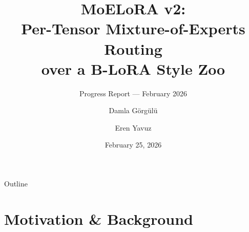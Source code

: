 \documentclass[aspectratio=169,10pt]{beamer}
\title[\textbf{MoELoRA}]{%
  \textbf{MoELoRA v2:}\\
  Per-Tensor Mixture-of-Experts Routing\\
  over a B-LoRA Style Zoo
}
\subtitle{Progress Report — February 2026}
\author{Damla Görg{\"u}lü \and Eren Yavuz}
\institute{Ko\c{c} University \\ VALAR Lab}
\date{February 25, 2026}
\begin{document}

\begin{frame}
  \titlepage
\end{frame}

\begin{frame}{Outline}
  \tableofcontents
\end{frame}

\section{Motivation \& Background}
\end{document}
